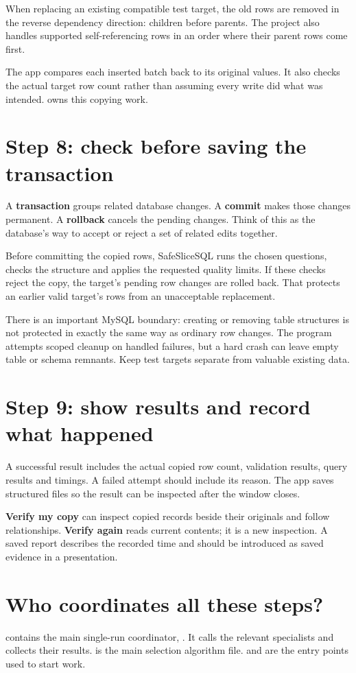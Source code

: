 \documentclass[12pt,a4paper,oneside]{report}
\begin{document}
When replacing an existing compatible test target, the old rows are removed in the reverse dependency direction: children before parents. The project also handles supported self-referencing rows in an order where their parent rows come first.

The app compares each inserted batch back to its original values. It also checks the actual target row count rather than assuming every write did what was intended.  owns this copying work.

\section{Step 8: check before saving the transaction}
A \textbf{transaction} groups related database changes. A \textbf{commit} makes those changes permanent. A \textbf{rollback} cancels the pending changes. Think of this as the database's way to accept or reject a set of related edits together.

Before committing the copied rows, SafeSliceSQL runs the chosen questions, checks the structure and applies the requested quality limits. If these checks reject the copy, the target's pending row changes are rolled back. That protects an earlier valid target's rows from an unacceptable replacement.

There is an important MySQL boundary: creating or removing table structures is not protected in exactly the same way as ordinary row changes. The program attempts scoped cleanup on handled failures, but a hard crash can leave empty table or schema remnants. Keep test targets separate from valuable existing data.

\section{Step 9: show results and record what happened}
A successful result includes the actual copied row count, validation results, query results and timings. A failed attempt should include its reason. The app saves structured files so the result can be inspected after the window closes.

\textbf{Verify my copy} can inspect copied records beside their originals and follow relationships. \textbf{Verify again} reads current contents; it is a new inspection. A saved report describes the recorded time and should be introduced as saved evidence in a presentation.

\section{Who coordinates all these steps?}
 contains the main single-run coordinator, . It calls the relevant specialists and collects their results.  is the main selection algorithm file.  and  are the entry points used to start work.
\end{document}
